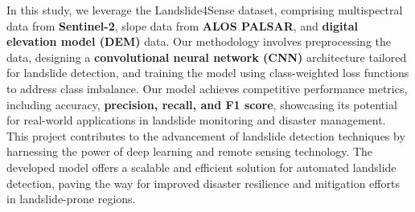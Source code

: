 \documentclass[12pt,a4paper]{report}
\begin{document}
In this study, we leverage the Landslide4Sense dataset, comprising multispectral data from \textbf{Sentinel-2}, slope data from \textbf{ALOS PALSAR}, and \textbf{digital elevation model (DEM)} data. Our methodology involves preprocessing the data, designing a \textbf{convolutional neural network (CNN)} architecture tailored for landslide detection, and training the model using class-weighted loss functions to address class imbalance. Our model achieves competitive performance metrics, including accuracy, \textbf{precision, recall, and F1 score}, showcasing its potential for real-world applications in landslide monitoring and disaster management.\\

This project contributes to the advancement of landslide detection techniques by harnessing the power of deep learning and remote sensing technology. The developed model offers a scalable and efficient solution for automated landslide detection, paving the way for improved disaster resilience and mitigation efforts in landslide-prone regions. 



\cleardoublepage



		\tableofcontents
\end{document}
